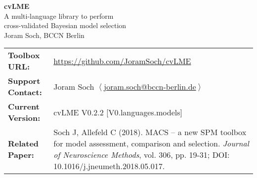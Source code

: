 \documentclass[a4paper,12pt]{article}
\begin{document}
\vspace*{1em}
\begin{center}
	\Huge
		\textbf{cvLME} \\
		\vspace{1em}
	\LARGE
		A multi-language library to perform \\ cross-validated Bayesian model selection \\
		\vspace{1em}
	\Large
		Joram Soch, BCCN Berlin \\
		\vspace{1em}
\end{center}



\vspace{1em}
\begin{center}
	\begin{tabular}{l p{10.5cm}}
		\textbf{Toolbox URL:} & \url{https://github.com/JoramSoch/cvLME} \\
		\textbf{Support Contact:} & Joram Soch $\left\langle\right.$\url{joram.soch@bccn-berlin.de}$\left.\right\rangle$  \\
		\textbf{Current Version:} & cvLME V0.2.2 [V0.languages.models] \\
		\textbf{Related Paper:} & Soch J, Allefeld C (2018). MACS -- a new SPM toolbox \linebreak[4]for model assessment, comparison and selection. \textit{Journal of \linebreak[4]Neuroscience Methods}, vol. 306, pp. 19-31; DOI: 10.1016/\linebreak[4]j.jneumeth.2018.05.017. \\
	\end{tabular}
\end{center}
\vspace*{1em}



\pagebreak
\tableofcontents



\pagebreak
{}



\end{document}
